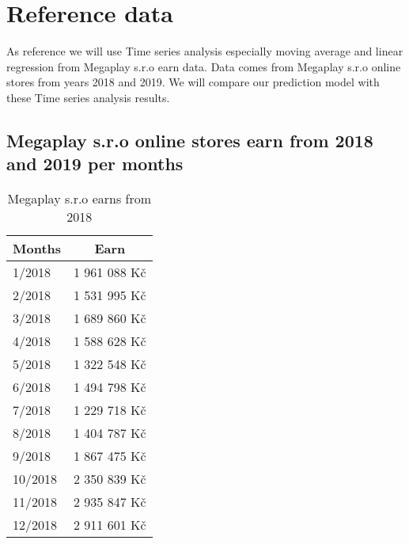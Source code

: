 
\chapter{Reference data} \label{reference_data}

As reference we will use Time series analysis especially moving average and linear regression from Megaplay s.r.o earn data. Data comes from Megaplay s.r.o online stores from years 2018 and 2019.
We will compare  our prediction model with these Time series analysis results.
\section{Megaplay s.r.o online stores earn from 2018 and 2019 per months}
\begin{table}[h!]
    \begin{center}
        \begin{tabular}{ | l | c | }
            \hline
            {\textbf{Months}} & \textbf{Earn} \\
            \hline
            1/2018 & 1 961 088 Kč \\
            \hline
            2/2018 & 1 531 995 Kč \\
            \hline
            3/2018 & 1 689 860 Kč \\
            \hline
            4/2018 & 1 588 628 Kč \\
            \hline
            5/2018 & 1 322 548 Kč \\
            \hline
            6/2018 & 1 494 798 Kč \\
            \hline
            7/2018 & 1 229 718 Kč \\
            \hline
            8/2018 & 1 404 787 Kč \\
            \hline
            9/2018 & 1 867 475 Kč \\
            \hline
            10/2018 & 2 350 839 Kč \\
            \hline
            11/2018 & 2 935 847 Kč \\
            \hline
            12/2018 & 2 911 601 Kč \\
            \hline
        \end{tabular}
    \end{center}
    \caption{Megaplay s.r.o earns from 2018}
    \label{Megaplay s.r.o earns from 2018}
\end{table}
\newpage
